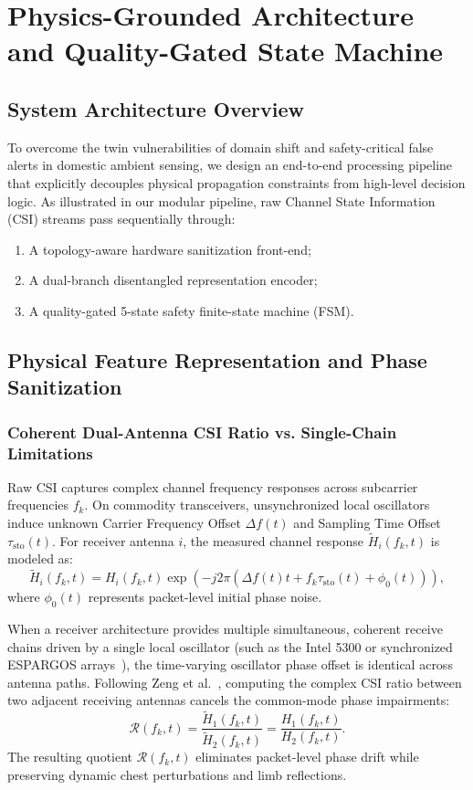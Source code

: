 \chapter{Physics-Grounded Architecture and Quality-Gated State Machine}

\section{System Architecture Overview}
To overcome the twin vulnerabilities of domain shift and safety-critical false alerts in domestic ambient sensing, we design an end-to-end processing pipeline that explicitly decouples physical propagation constraints from high-level decision logic. As illustrated in our modular pipeline, raw Channel State Information (CSI) streams pass sequentially through:
\begin{enumerate}
    \item A topology-aware hardware sanitization front-end;
    \item A dual-branch disentangled representation encoder;
    \item A quality-gated 5-state safety finite-state machine (FSM).
\end{enumerate}

\section{Physical Feature Representation and Phase Sanitization}
\subsection{Coherent Dual-Antenna CSI Ratio vs. Single-Chain Limitations}
Raw CSI captures complex channel frequency responses across subcarrier frequencies $f_k$. On commodity transceivers, unsynchronized local oscillators induce unknown Carrier Frequency Offset $\Delta f(t)$ and Sampling Time Offset $\tau_{\text{sto}}(t)$. For receiver antenna $i$, the measured channel response $\widetilde{H}_i(f_k, t)$ is modeled as:
\begin{equation}
    \widetilde{H}_i(f_k, t) = H_i(f_k, t) \exp\left(-j 2\pi \left(\Delta f(t) t + f_k \tau_{\text{sto}}(t) + \phi_0(t)\right)\right),
\end{equation}
where $\phi_0(t)$ represents packet-level initial phase noise.

When a receiver architecture provides multiple simultaneous, coherent receive chains driven by a single local oscillator (such as the Intel 5300 or synchronized ESPARGOS arrays~\cite{espargos2024espargos}), the time-varying oscillator phase offset is identical across antenna paths. Following Zeng et al.~\cite{author2019farsense}, computing the complex CSI ratio between two adjacent receiving antennas cancels the common-mode phase impairments:
\begin{equation}
    \mathcal{R}(f_k, t) = \frac{\widetilde{H}_1(f_k, t)}{\widetilde{H}_2(f_k, t)} = \frac{H_1(f_k, t)}{H_2(f_k, t)}.
\end{equation}
The resulting quotient $\mathcal{R}(f_k, t)$ eliminates packet-level phase drift while preserving dynamic chest perturbations and limb reflections.

